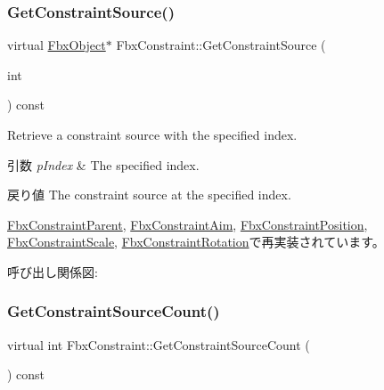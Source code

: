 \subsubsection{\texorpdfstring{Get\+Constraint\+Source()}{GetConstraintSource()}}
{\footnotesize\ttfamily virtual \hyperlink{class_fbx_object}{Fbx\+Object}$\ast$ Fbx\+Constraint\+::\+Get\+Constraint\+Source (\begin{DoxyParamCaption}\item[{int}]{ }\end{DoxyParamCaption}) const\hspace{0.3cm}{\ttfamily [virtual]}}

Retrieve a constraint source with the specified index. 
\begin{DoxyParams}{引数}
{\em p\+Index} & The specified index. \\
\hline
\end{DoxyParams}
\begin{DoxyReturn}{戻り値}
The constraint source at the specified index. 
\end{DoxyReturn}


\hyperlink{class_fbx_constraint_parent_a687e5a56dfd3882d4ff0c3454a976051}{Fbx\+Constraint\+Parent}, \hyperlink{class_fbx_constraint_aim_ae5d3634ababc5cb0af0734b41c78218a}{Fbx\+Constraint\+Aim}, \hyperlink{class_fbx_constraint_position_a0024d10c8464eba13d5f3c3037e973cf}{Fbx\+Constraint\+Position}, \hyperlink{class_fbx_constraint_scale_ac957fc33cab352ef355602fb4325c5b7}{Fbx\+Constraint\+Scale}, \hyperlink{class_fbx_constraint_rotation_a4bfb008520cb5aa6996104c292e5819e}{Fbx\+Constraint\+Rotation}で再実装されています。

呼び出し関係図\+:
\mbox{\label{class_fbx_constraint_aa702f86c6a1832ce3b4905911e66c58f}} 
\subsubsection{\texorpdfstring{Get\+Constraint\+Source\+Count()}{GetConstraintSourceCount()}}
{\footnotesize\ttfamily virtual int Fbx\+Constraint\+::\+Get\+Constraint\+Source\+Count (\begin{DoxyParamCaption}{ }\end{DoxyParamCaption}) const\hspace{0.3cm}{\ttfamily [virtual]}}

